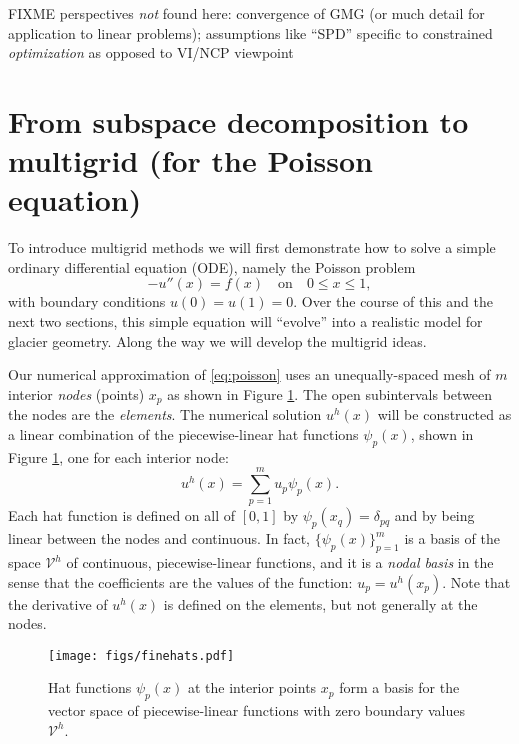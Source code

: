 \documentclass[letterpaper,final,12pt,reqno]{amsart}
\begin{document}
FIXME perspectives \emph{not} found here: convergence of GMG (or much detail for application to linear problems); assumptions like ``SPD'' specific to constrained \emph{optimization} as opposed to VI/NCP viewpoint


\section{From subspace decomposition to multigrid (for the Poisson equation)} \label{sec:subspace}

To introduce multigrid methods we will first demonstrate how to solve a simple ordinary differential equation (ODE), namely the Poisson problem
\begin{equation}
- u''(x) = f(x) \quad \text{on} \quad 0 \le x \le 1, \label{eq:poisson}
\end{equation}
with boundary conditions $u(0)=u(1)=0$.  Over the course of this and the next two sections, this simple equation will ``evolve'' into a realistic model for glacier geometry.  Along the way we will develop the multigrid ideas.

Our numerical approximation of \eqref{eq:poisson} uses an unequally-spaced mesh of $m$ interior \emph{nodes} (points) $x_p$ as shown in Figure \ref{fig:finehats}.  The open subintervals between the nodes are the \emph{elements}.  The numerical solution $u^h(x)$ will be constructed as a linear combination of the piecewise-linear hat functions $\psi_p(x)$, shown in Figure \ref{fig:finehats}, one for each interior node:
\begin{equation}
u^h(x) = \sum_{p=1}^m u_p \psi_p(x). \label{eq:trialsolution}
\end{equation}
Each hat function is defined on all of $[0,1]$ by $\psi_p(x_q) = \delta_{pq}$ and by being linear between the nodes and continuous.  In fact, $\{\psi_p(x)\}_{p=1}^m$ is a basis of the space $\mathcal{V}^h$ of continuous, piecewise-linear functions, and it is a \emph{nodal basis} in the sense that the coefficients are the values of the function: $u_p=u^h(x_p)$.  Note that the derivative of $u^h(x)$ is defined on the elements, but not generally at the nodes.

\begin{figure}
\texttt{[image: figs/finehats.pdf]}
\caption{Hat functions $\psi_p(x)$ at the interior points $x_p$ form a basis for the vector space of piecewise-linear functions  with zero boundary values $\mathcal{V}^h$.}
\label{fig:finehats}
\end{figure}
\end{document}
